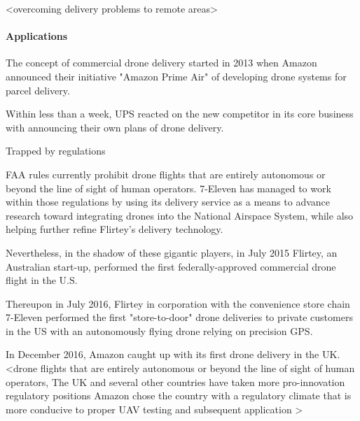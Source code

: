 <overcoming delivery problems to remote areas>


\paragraph{Applications}

The concept of commercial drone delivery started in 2013
when Amazon announced their initiative "Amazon Prime Air" of developing drone systems for 
parcel delivery.

Within less than a week, UPS reacted on the new competitor in its core business with
announcing their own plans of drone delivery.

Trapped by regulations

FAA rules currently prohibit drone flights 
that are entirely autonomous or 
beyond the line of sight of human operators. 
7-Eleven has managed to work within those regulations
by using its delivery service as a means to advance research 
toward integrating drones into the National Airspace System, 
while also helping further refine Flirtey’s delivery technology.



Nevertheless, in the shadow of these gigantic players,
in July 2015 Flirtey, an Australian start-up, performed the first
federally-approved commercial drone flight in the U.S.

Thereupon in July 2016, Flirtey in corporation with 
the convenience store chain 7-Eleven 
performed the first "store-to-door" drone deliveries to private customers
in the US with an autonomously flying drone relying on precision GPS.

In December 2016, Amazon caught up with its first drone delivery
in the UK. 
<drone flights that are entirely autonomous or beyond the line of sight of human operators,
The UK and several other countries have taken more pro-innovation regulatory positions
Amazon chose the country with a regulatory climate that is more conducive to proper UAV testing and subsequent application
>

